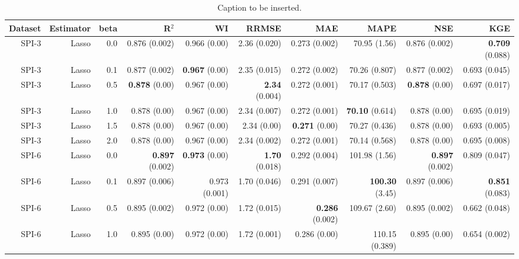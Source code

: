\begin{table}
\centering
\caption{Caption to be inserted.}
\label{sp__comparison_datasets_table}
\begin{tabular}{rrrrrrrrrr}
\toprule
Dataset & Estimator &  beta &                R$^2$ &                  WI &               RRMSE &                  MAE &                  MAPE &                  NSE &                  KGE \\
\midrule
  SPI-3 &     Lasso &   0.0 &        0.876 (0.002) &        0.966 (0.00) &        2.36 (0.020) &        0.273 (0.002) &          70.95 (1.56) &        0.876 (0.002) & { \bf 0.709} (0.088) \\
  SPI-3 &     Lasso &   0.1 &        0.877 (0.002) & { \bf 0.967} (0.00) &        2.35 (0.015) &        0.272 (0.002) &         70.26 (0.807) &        0.877 (0.002) &        0.693 (0.045) \\
  SPI-3 &     Lasso &   0.5 &  { \bf 0.878} (0.00) &        0.967 (0.00) & { \bf 2.34} (0.004) &        0.272 (0.001) &         70.17 (0.503) &  { \bf 0.878} (0.00) &        0.697 (0.017) \\
  SPI-3 &     Lasso &   1.0 &         0.878 (0.00) &        0.967 (0.00) &        2.34 (0.007) &        0.272 (0.001) &  { \bf 70.10} (0.614) &         0.878 (0.00) &        0.695 (0.019) \\
  SPI-3 &     Lasso &   1.5 &         0.878 (0.00) &        0.967 (0.00) &         2.34 (0.00) &  { \bf 0.271} (0.00) &         70.27 (0.436) &         0.878 (0.00) &        0.693 (0.005) \\
  SPI-3 &     Lasso &   2.0 &         0.878 (0.00) &        0.967 (0.00) &        2.34 (0.002) &        0.272 (0.001) &         70.14 (0.568) &         0.878 (0.00) &        0.695 (0.008) \\
  SPI-6 &     Lasso &   0.0 & { \bf 0.897} (0.002) & { \bf 0.973} (0.00) & { \bf 1.70} (0.018) &        0.292 (0.004) &         101.98 (1.56) & { \bf 0.897} (0.002) &        0.809 (0.047) \\
  SPI-6 &     Lasso &   0.1 &        0.897 (0.006) &       0.973 (0.001) &        1.70 (0.046) &        0.291 (0.007) &  { \bf 100.30} (3.45) &        0.897 (0.006) & { \bf 0.851} (0.083) \\
  SPI-6 &     Lasso &   0.5 &        0.895 (0.002) &        0.972 (0.00) &        1.72 (0.015) & { \bf 0.286} (0.002) &         109.67 (2.60) &        0.895 (0.002) &        0.662 (0.048) \\
  SPI-6 &     Lasso &   1.0 &         0.895 (0.00) &        0.972 (0.00) &        1.72 (0.001) &         0.286 (0.00) &        110.15 (0.389) &         0.895 (0.00) &        0.654 (0.002) \\

\end{tabular}
\end{table}
